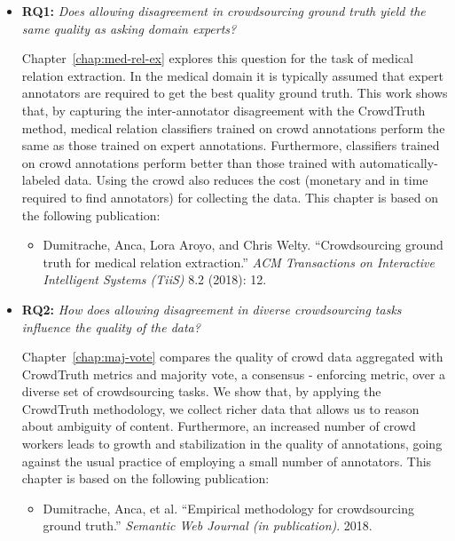 \begin{itemize}
    \item \textbf{RQ1:} \textit{Does allowing disagreement in crowdsourcing ground truth yield the same quality as asking domain experts?}
    
    Chapter~\ref{chap:med-rel-ex} explores this question for the task of medical relation extraction. In the medical domain it is typically assumed that expert annotators are required to get the best quality ground truth. This work shows that, by capturing the inter-annotator disagreement with the CrowdTruth method, medical relation classifiers trained on crowd annotations perform the same as those trained on expert annotations. Furthermore, classifiers trained on crowd annotations perform better than those trained with automatically-labeled data. Using the crowd also reduces the cost (monetary and in time required to find annotators) for collecting the data. This chapter is based on the following publication:
    
    \begin{itemize}
        \item Dumitrache, Anca, Lora Aroyo, and Chris Welty. ``Crowdsourcing ground truth for medical relation extraction.'' \textit{ACM Transactions on Interactive Intelligent Systems (TiiS)} 8.2 (2018): 12.~\cite{DBLP:journals/corr/DumitracheAW17}
    \end{itemize}

    \item \textbf{RQ2:} \textit{How does allowing disagreement in diverse crowdsourcing tasks influence the quality of the data?}
    
    Chapter~\ref{chap:maj-vote} compares the quality of crowd data aggregated with CrowdTruth metrics and majority vote, a consensus - enforcing metric, over a diverse set of crowdsourcing tasks. We show that, by applying the CrowdTruth methodology, we collect richer data that allows us to reason about ambiguity of content. Furthermore, an increased number of crowd workers leads to growth and stabilization in the quality of annotations, going against the usual practice of employing a small number of annotators. This chapter is based on the following publication:
    
    \begin{itemize}
        \item Dumitrache, Anca, et al. ``Empirical methodology for crowdsourcing ground truth.'' \textit{Semantic Web Journal (in publication)}. 2018.~\cite{dumitracheempirical}
    \end{itemize}


\end{itemize}
